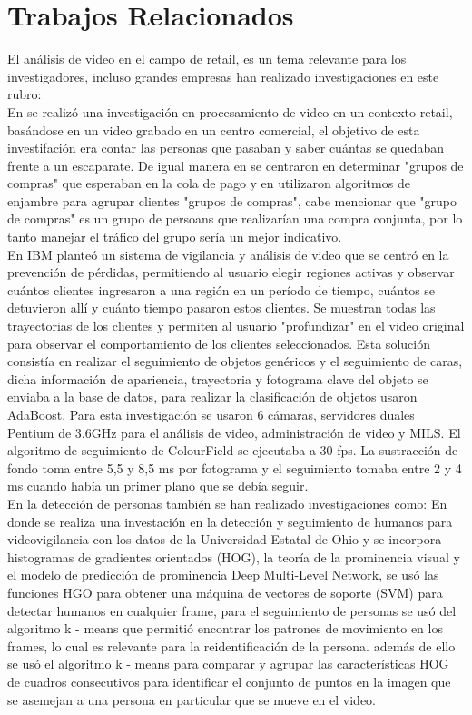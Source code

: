 \documentclass[conference]{IEEEtran}
\begin{document}
\section{Trabajos Relacionados}
El análisis de video en el campo de retail, es un tema relevante para los investigadores, incluso grandes  empresas han realizado investigaciones en este rubro:
\\
En \cite{ellis2002performance} se realizó una investigación en procesamiento de video en un contexto retail, basándose en un video grabado en un centro comercial, el objetivo de esta investifación era contar las personas que pasaban y saber cuántas se quedaban frente a un escaparate. De igual manera en \cite{haritaoglu2001detection} se centraron en determinar "grupos de compras" que esperaban en la cola de pago y en \cite{leykin2007detecting} utilizaron algoritmos de enjambre para agrupar clientes "grupos de compras", cabe mencionar que "grupo de compras" es un grupo de persoans que realizarían una compra conjunta, por lo tanto manejar el tráfico del grupo sería un mejor indicativo.
\\
En \cite{senior2007video} IBM planteó un sistema de vigilancia y análisis de video que se centró en la prevención de pérdidas, permitiendo al usuario elegir regiones activas y observar cuántos clientes ingresaron a una región en un período de tiempo, cuántos se detuvieron allí y cuánto tiempo pasaron estos clientes. Se muestran todas las trayectorias de los clientes y permiten al usuario "profundizar" en el video original para observar el comportamiento de los clientes seleccionados. Esta solución consistía en realizar el seguimiento de objetos genéricos y el seguimiento de caras, dicha información de apariencia, trayectoria y fotograma clave del objeto se enviaba a la base de datos, para realizar la clasificación de objetos usaron AdaBoost. Para esta investigación se usaron 6 cámaras, servidores duales Pentium de 3.6GHz para el análisis de video, administración de video y MILS. El algoritmo de seguimiento de ColourField se ejecutaba a 30 fps. La sustracción de fondo toma entre 5,5 y 8,5 ms por fotograma y el seguimiento tomaba entre 2 y 4 ms cuando había un primer plano que se debía seguir.
\\
En la detección de personas también se han realizado investigaciones como:
En \cite{gajjar2017human} donde se realiza una investación en la detección y seguimiento de humanos para videovigilancia con los datos de la Universidad Estatal de Ohio y se incorpora histogramas de gradientes orientados (HOG), la teoría de la prominencia visual y el modelo de predicción de prominencia Deep Multi-Level Network, se usó las funciones HGO para obtener una máquina de vectores de soporte (SVM) para detectar humanos en cualquier frame, para el seguimiento de personas se usó del algoritmo k - means que permitió encontrar los patrones de movimiento en los frames, lo cual es relevante para la reidentificación de la persona. además de ello se usó el algoritmo k - means para comparar y agrupar las características HOG de cuadros consecutivos para identificar el conjunto de puntos en la imagen que se asemejan a una persona en particular que se mueve en el video.
\end{document}
